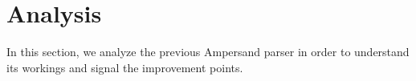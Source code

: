 
\section{Analysis}
\label{sec:analysis}
In this section, we analyze the previous Ampersand parser in order to understand its workings and signal the improvement points.



